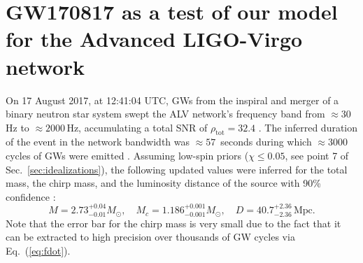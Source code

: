 \documentclass[prd,amsmath,amssymb,aps,floats,amsfonts,notitlepage,superscriptaddress,eqsecnum,nofootinbib,10pt]{revtex4-1}
\newcommand{\be}{\begin{equation}}
\newcommand{\ee}{\end{equation}}
\begin{document}
\section{GW170817 as a test of our model for the Advanced LIGO-Virgo network}\label{sec:GW170817}
On 17 August 2017, at 12:41:04 UTC, GWs from the inspiral and merger of a binary neutron star system %
swept the ALV network's frequency band from $\approx 30\,$Hz to $\approx 2000\,$Hz, accumulating a total SNR of
$\rho_\text{tot} = 32.4$ \cite{GW170817}.
The inferred duration of the event in the network bandwidth was $\approx 57\,$ seconds during which $\approx 3000$ cycles of GWs were emitted \cite{GW170817_Facts}.
Assuming low-spin priors  ($\chi \le 0.05$, see point 7 of Sec.~\ref{sec:idealizations}), the following updated values were inferred for the total mass, the chirp mass,
and the luminosity distance of the source with 90\% confidence \cite{GW170817_2018}:
%
\be
M = 2.73^{+0.04}_{-0.01} M_\odot,\quad M_c = 1.186^{+0.001}_{-0.001} M_\odot,\quad D= 40.7^{+2.36}_{-2.36}\,\text{Mpc}. \label{eq:GW170817_params}
\ee
%
Note that the error bar for the chirp mass is very small
due to the fact that it can be extracted to high precision over thousands of GW cycles via Eq.~(\ref{eq:fdot}). 
%
%
\end{document}
